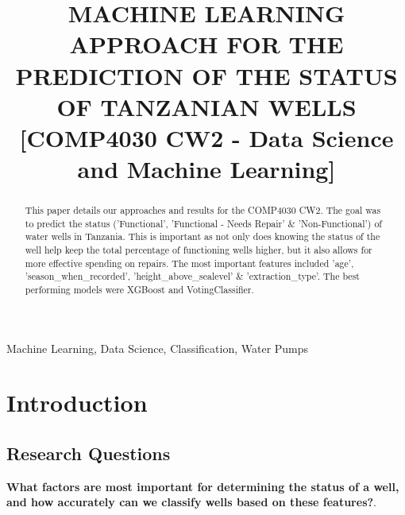 \documentclass[conference]{IEEEtran}
\begin{document}
\title{MACHINE LEARNING APPROACH FOR THE PREDICTION OF THE STATUS OF TANZANIAN WELLS [COMP4030 CW2 - Data Science and Machine Learning]
}

\author{
\and
{}
}

\maketitle

\begin{abstract}
  This paper details our approaches and results for the COMP4030 CW2. The goal was to predict the status ('Functional', 'Functional - Needs Repair' \& 'Non-Functional') of water wells in Tanzania. This is important as not only does knowing the status of the well help keep the total percentage of functioning wells higher, but it also allows for more effective spending on repairs. The most important features included 'age', 'season\_when\_recorded', 'height\_above\_sealevel' \& 'extraction\_type'. The best performing models were XGBoost and VotingClassifier.
\end{abstract}

\begin{IEEEkeywords}
  Machine Learning, Data Science, Classification, Water Pumps
\end{IEEEkeywords}

\section{Introduction}

\subsection{Research Questions}

\textbf{What factors are most important for determining the status of a well, and how accurately can we classify wells based on these features?}. 
\end{document}
